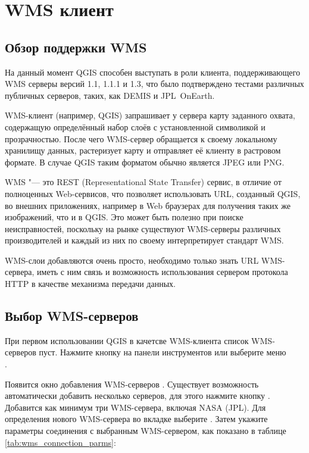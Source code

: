 \section{WMS
клиент}\label{sec:ogc-wms}

\subsection{Обзор поддержки
WMS}\label{sec:ogc-wms-about}

На данный момент QGIS способен выступать в роли клиента, поддерживающего WMS
серверы версий 1.1, 1.1.1 и 1.3, что было подтверждено тестами различных
публичных серверов, таких, как DEMIS и JPL~OnEarth.

WMS-клиент (например, QGIS) запрашивает у сервера карту заданного
охвата, содержащую определённый набор слоёв с установленной символикой и
прозрачностью. После чего WMS-сервер обращается к своему локальному хранилищу
данных, растеризует карту и отправляет её клиенту в растровом формате. В
случае QGIS таким форматом обычно является JPEG или PNG.

WMS "--- это REST (Representational State Transfer) сервис, в отличие от
полноценных Web-сервисов, что позволяет использовать URL, созданный QGIS,
во внешних приложениях, например в Web браузерах для получения таких же
изображений, что и в QGIS. Это может быть полезно при поиске неисправностей,
поскольку на рынке существуют WMS-серверы различных производителей и каждый
из них по своему интерпретирует стандарт WMS.

WMS-слои добавляются очень просто, необходимо только знать URL WMS-сервера,
иметь с ним связь и возможность использования сервером протокола HTTP в
качестве механизма передачи данных.

\subsection{Выбор WMS-серверов}\label{sec:ogc-wms-servers}

При первом использовании QGIS в качетсве WMS-клиента список WMS-серверов пуст.
Нажмите кнопку  на панели
инструментов или выберите меню  \arrow \\
.

Появится окно добавления WMS-серверов .
Существует возможность автоматически добавить несколько серверов, для
этого нажмите кнопку . Добавится как минимум три
WMS-сервера, включая NASA (JPL). Для определения нового WMS-сервера
во вкладке  выберите . Затем укажите
параметры соединения с выбранным WMS-сервером, как показано в таблице
\ref{tab:wms_connection_parms}:

